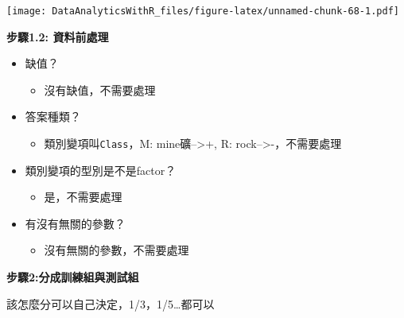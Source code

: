 \documentclass[]{book}
\newenvironment{Shaded}{\begin{snugshade}}{\end{snugshade}}
\newcommand{\CommentTok}[1]{\textcolor[rgb]{0.56,0.35,0.01}{\textit{#1}}}
\newcommand{\DecValTok}[1]{\textcolor[rgb]{0.00,0.00,0.81}{#1}}
\newcommand{\KeywordTok}[1]{\textcolor[rgb]{0.13,0.29,0.53}{\textbf{#1}}}
\newcommand{\NormalTok}[1]{#1}
\newcommand{\OperatorTok}[1]{\textcolor[rgb]{0.81,0.36,0.00}{\textbf{#1}}}
\providecommand{\tightlist}{%
  \setlength{\itemsep}{0pt}\setlength{\parskip}{0pt}}
\begin{document}
\texttt{[image: DataAnalyticsWithR\_files/figure-latex/unnamed-chunk-68-1.pdf]}

\textbf{步驟1.2: 資料前處理}

\begin{itemize}
\tightlist
\item
  缺值？

  \begin{itemize}
  \tightlist
  \item
    沒有缺值，不需要處理
  \end{itemize}
\item
  答案種類？

  \begin{itemize}
  \tightlist
  \item
    類別變項叫\texttt{Class}，M: mine礦--\textgreater+, R: rock--\textgreater-，不需要處理
  \end{itemize}
\item
  類別變項的型別是不是factor？

  \begin{itemize}
  \tightlist
  \item
    是，不需要處理
  \end{itemize}
\item
  有沒有無關的參數？

  \begin{itemize}
  \tightlist
  \item
    沒有無關的參數，不需要處理
  \end{itemize}
\end{itemize}

\textbf{步驟2:分成訓練組與測試組}

該怎麼分可以自己決定，1/3，1/5\ldots 都可以

\begin{Shaded}
\end{Shaded}
\end{document}
